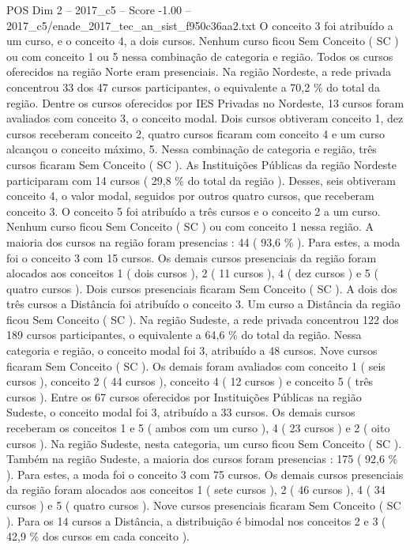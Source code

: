 \begin{textsample}{POS Dim 2 – 2017\_c5 – Score -1.00 – 2017\_c5/enade\_2017\_tec\_an\_sist\_f950c36aa2.txt}
O conceito 3 foi atribuído a um curso, e o conceito 4, a dois cursos.
Nenhum curso ficou Sem Conceito ( SC ) ou com conceito 1 ou 5 nessa combinação de categoria e região.
Todos os cursos oferecidos na região Norte eram presenciais.
Na região Nordeste, a rede privada concentrou 33 dos 47 cursos participantes, o equivalente a 70,2 \% do total da região.
Dentre os cursos oferecidos por IES Privadas no Nordeste, 13 cursos foram avaliados com conceito 3, o conceito modal.
Dois cursos obtiveram conceito 1, dez cursos receberam conceito 2, quatro cursos ficaram com conceito 4 e um curso alcançou o conceito máximo, 5.
Nessa combinação de categoria e região, três cursos ficaram Sem Conceito ( SC ).
As Instituições Públicas da região Nordeste participaram com 14 cursos ( 29,8 \% do total da região ).
Desses, seis obtiveram conceito 4, o valor modal, seguidos por outros quatro cursos, que receberam conceito 3.
O conceito 5 foi atribuído a três cursos e o conceito 2 a um curso.
Nenhum curso ficou Sem Conceito ( SC ) ou com conceito 1 nessa região.
A maioria dos cursos na região foram presencias : 44 ( 93,6 \% ).
Para estes, a moda foi o conceito 3 com 15 cursos.
Os demais cursos presenciais da região foram alocados aos conceitos 1 ( dois cursos ), 2 ( 11 cursos ), 4 ( dez cursos ) e 5 ( quatro cursos ).
Dois cursos presenciais ficaram Sem Conceito ( SC ).
A dois dos três cursos a Distância foi atribuído o conceito 3.
Um curso a Distância da região ficou Sem Conceito ( SC ).
Na região Sudeste, a rede privada concentrou 122 dos 189 cursos participantes, o equivalente a 64,6 \% do total da região.
Nessa categoria e região, o conceito modal foi 3, atribuído a 48 cursos.
Nove cursos ficaram Sem Conceito ( SC ).
Os demais foram avaliados com conceito 1 ( seis cursos ), conceito 2 ( 44 cursos ), conceito 4 ( 12 cursos ) e conceito 5 ( três cursos ).
Entre os 67 cursos oferecidos por Instituições Públicas na região Sudeste, o conceito modal foi 3, atribuído a 33 cursos.
Os demais cursos receberam os conceitos 1 e 5 ( ambos com um curso ), 4 ( 23 cursos ) e 2 ( oito cursos ).
Na região Sudeste, nesta categoria, um curso ficou Sem Conceito ( SC ).
Também na região Sudeste, a maioria dos cursos foram presencias : 175 ( 92,6 \% ).
Para estes, a moda foi o conceito 3 com 75 cursos.
Os demais cursos presenciais da região foram alocados aos conceitos 1 ( sete cursos ), 2 ( 46 cursos ), 4 ( 34 cursos ) e 5 ( quatro cursos ).
Nove cursos presenciais ficaram Sem Conceito ( SC ).
Para os 14 cursos a Distância, a distribuição é bimodal nos conceitos 2 e 3 ( 42,9 \% dos cursos em cada conceito ).

\end{textsample}
